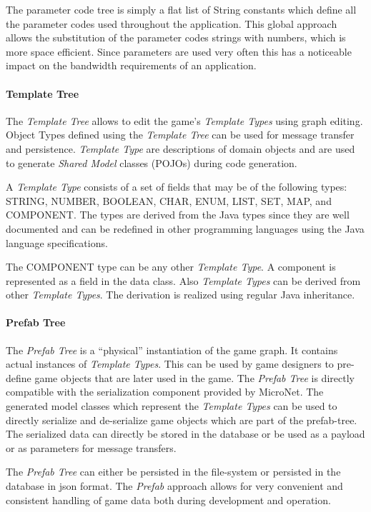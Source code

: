 The parameter code tree is simply a flat list of String constants which define
all the parameter codes used throughout the application. This global approach
allows the substitution of the parameter codes strings with numbers, which is
more space efficient. Since parameters are used very often this has a noticeable
impact on the bandwidth requirements of an application.

\paragraph{Template Tree}

The \textit{Template Tree} allows to edit the game's \textit{Template Types}
using graph editing. Object Types defined using the \textit{Template Tree} can
be used for message transfer and persistence. \textit{Template Type} are
descriptions of domain objects and are used to generate \textit{Shared Model}
classes (POJOs) during code generation.

A \textit{Template Type} consists of a set of fields that may be of the
following types: STRING, NUMBER, BOOLEAN, CHAR, ENUM, LIST, SET, MAP, and
COMPONENT. The types are derived from the Java types since they are well
documented and can be redefined in other programming languages using the Java
language specifications.

The COMPONENT type can be any other \textit{Template Type}. A component is
represented as a field in the data class. Also \textit{Template Types} can be
derived from other \textit{Template Types}. The derivation is realized using
regular Java inheritance.


\paragraph{Prefab Tree}

The \textit{Prefab Tree} is a ``physical'' instantiation of the game graph. It
contains actual instances of \textit{Template Types}. This can be used by game
designers to pre-define game objects that are later used in the game. The
\textit{Prefab Tree} is directly compatible with the serialization component
provided by MicroNet. The generated model classes which represent the
\textit{Template Types} can be used to directly serialize and de-serialize game
objects which are part of the prefab-tree. The serialized data can directly be
stored in the database or be used as a payload or as parameters for message
transfers.

The \textit{Prefab Tree} can either be persisted in the file-system or persisted in the
database in \gls{json} format. The \textit{Prefab} approach allows for very
convenient and consistent handling of game data both during development and
operation.


